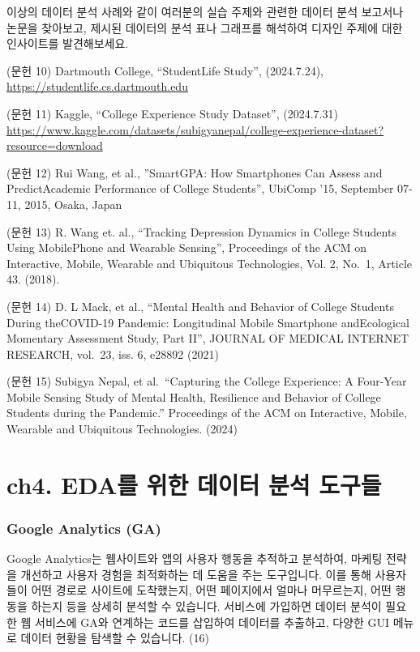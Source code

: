 \documentclass[
  letterpaper,
]{book}
\begin{document}
이상의 데이터 분석 사례와 같이 여러분의 실습 주제와 관련한 데이터 분석
보고서나 논문을 찾아보고, 제시된 데이터의 분석 표나 그래프를 해석하여
디자인 주제에 대한 인사이트를 발견해보세요.

(문헌 10) Dartmouth College, ``StudentLife Study'', (2024.7.24),
\href{https://studentlife.cs.dartmouth.edu/}{https://studentlife.cs.dartmouth.edu}

(문헌 11) Kaggle, ``College Experience Study Dataset'', (2024.7.31)
\url{https://www.kaggle.com/datasets/subigyanepal/college-experience-dataset?resource=download}

(문헌 12) Rui Wang, et al., ''SmartGPA: How Smartphones Can Assess and
PredictAcademic Performance of College Students'', UbiComp '15,
September 07-11, 2015, Osaka, Japan

(문헌 13) R. Wang et. al., ``Tracking Depression Dynamics in College
Students Using MobilePhone and Wearable Sensing'', Proceedings of the
ACM on Interactive, Mobile, Wearable and Ubiquitous Technologies, Vol.
2, No.~1, Article 43. (2018).

(문헌 14) D. L Mack, et al., ``Mental Health and Behavior of College
Students During theCOVID-19 Pandemic: Longitudinal Mobile Smartphone
andEcological Momentary Assessment Study, Part II'', JOURNAL OF MEDICAL
INTERNET RESEARCH, vol.~23, iss. 6, e28892 (2021)

(문헌 15) Subigya Nepal, et al.~``Capturing the College Experience: A
Four-Year Mobile Sensing Study of Mental Health, Resilience and Behavior
of College Students during the Pandemic.'' Proceedings of the ACM on
Interactive, Mobile, Wearable and Ubiquitous Technologies. (2024)

\chapter{ch4. EDA를 위한 데이터 분석
도구들}\label{ch4.-edauxb97c-uxc704uxd55c-uxb370uxc774uxd130-uxbd84uxc11d-uxb3c4uxad6cuxb4e4}

\subsection{Google Analytics (GA)}\label{google-analytics-ga}

Google Analytics는 웹사이트와 앱의 사용자 행동을 추적하고 분석하여,
마케팅 전략을 개선하고 사용자 경험을 최적화하는 데 도움을 주는
도구입니다. 이를 통해 사용자들이 어떤 경로로 사이트에 도착했는지, 어떤
페이지에서 얼마나 머무르는지, 어떤 행동을 하는지 등을 상세히 분석할 수
있습니다. 서비스에 가입하면 데이터 분석이 필요한 웹 서비스에 GA와
연계하는 코드를 삽입하여 데이터를 추출하고, 다양한 GUI 메뉴로 데이터
현황을 탐색할 수 있습니다. (16)
\end{document}
